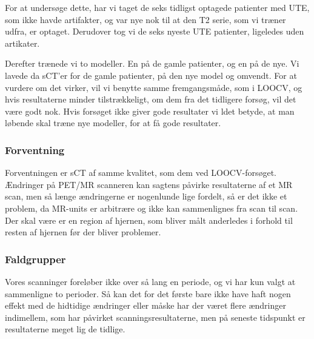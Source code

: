 For at undersøge dette, har vi taget de seks
tidligst optagede patienter med UTE, som ikke havde artifakter, og
var nye nok til at den T2 serie, som vi træner udfra, er optaget.
Derudover tog vi de seks nyeste UTE patienter, ligeledes uden artikater.


Derefter trænede vi to modeller. En på de gamle patienter, og en på de
nye. Vi lavede da sCT'er for de gamle patienter, på den nye model og
omvendt. For at vurdere om det virker, vil vi benytte samme fremgangsmåde,
som i LOOCV, og hvis resultaterne minder tilstrækkeligt, om dem fra det
tidligere forsøg, vil det være godt nok. Hvis forsøget ikke giver gode
resultater vi ldet betyde, at man løbende skal træne nye modeller, for at
få gode resultater.

\subsubsection{Forventning}

Forventningen er sCT af samme kvalitet, som dem ved LOOCV-forsøget.
Ændringer på PET/MR scanneren kan sagtens påvirke resultaterne af et MR
scan, men så længe ændringerne er nogenlunde lige fordelt, så er det ikke
et problem, da MR-units er arbitrære og ikke kan sammenlignes fra scan til
scan. Der skal være er en region af hjernen, som bliver målt anderledes i
forhold til resten af hjernen før der bliver problemer.

\subsubsection{Faldgrupper}

Vores scanninger foreløber ikke over så lang en periode, og vi har
kun valgt at sammenligne to perioder. Så kan det for det første
bare ikke have haft nogen effekt med de hidtidige ændringer eller
måske har der været flere ændringer indimellem, som har påvirket
scanningsresultaterne, men på seneste tidspunkt er resultaterne meget
lig de tidlige.

